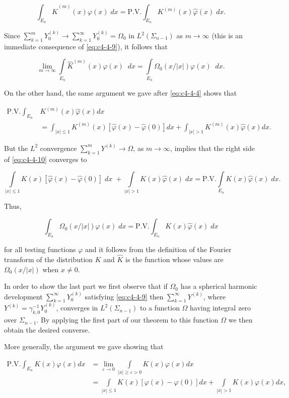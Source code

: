 \[
\int_{E_{n}}\hat{K}^{(m)}(x)\varphi(x)\;d x=\mathrm{P.V.}\int_{E_{n}}K^{(m)}(x)\hat{\varphi}(x)\;d x.
\]

Since $\sum_{k=1}^{m} Y_0^{(k)} \to \sum_{k=1}^{\infty} Y_0^{(k)} = \Omega_0$ in $L^2(\Sigma_{n-1})$ as $m \to \infty$ (this is an immediate consequence of \eqref{eq:c4-4-9}), it follows that

\[
\lim_{m\to\infty}\int\limits_{E_{n}}\hat{K}^{(m)}(x)\varphi(x)\mathop{}{d}x=\int\limits_{E_{n}}\Omega_{0}(x/|x|)\varphi(x)\mathop{}{d}x.
\]

On the other hand, the same argument we gave after \eqref{eq:c4-4-4} shows that

\begin{equation}\label{eq:c4-4-10}
\begin{aligned}\mathrm{P.V.}\int_{E_{n}}&K^{(m)}(x)\hat{\varphi}(x)dx\\&=\int_{|x|\leq1}K^{(m)}(x)[\hat{\varphi}(x)-\hat{\varphi}(0)]dx+\int_{|x|>1}K^{(m)}(x)\hat{\varphi}(x)dx.\end{aligned}
\end{equation}

But the $L^2$ convergence $\sum_{k=1}^m Y^{(k)} \to \Omega$, as $m \to \infty$, implies that the right side of \eqref{eq:c4-4-10} converges to

\[
\int\limits_{|x|\leq1}K(x)[\hat{\varphi}(x)-\hat{\varphi}(0)]\;{d}x\;+\int\limits_{|x|>1}K(x)\hat{\varphi}(x)\;{d}x=\mathrm{P.V.}\int\limits_{E_{n}}K(x)\hat{\varphi}(x)\;{d}x.
\]

Thus,

\[
\int_{E_{n}}\Omega_{0}(x/|x|)\varphi(x)\;d x=\mathrm{P.V.}\int_{E_{n}}K(x)\hat{\varphi}(x)\;d x
\]

for all testing functions $\varphi$ and it follows from the definition of the Fourier transform of the distribution $K$ and $\hat{K}$ is the function whose values are $\Omega_0(x/|x|)$ when $x \neq 0$.

In order to show the last part we first observe that if $\Omega_0$ has a spherical harmonic development $\sum_{k=1}^{\infty} Y_0^{(k)}$ satisfying \eqref{eq:c4-4-9} then $\sum_{k=1}^{\infty} Y^{(k)}$, where $Y^{(k)} = \gamma_{k,0}^{-1} Y_0^{(k)}$, converges in $L^2(\Sigma_{n-1})$ to a function $\Omega$ having integral zero over $\Sigma_{n-1}$. By applying the first part of our theorem to this function $\Omega$ we then obtain the desired converse.

More generally, the argument we gave showing that

\[
\begin{aligned}\mathrm{P.V.}\int_{E_{n}}K(x)\varphi(x)dx&=\lim_{\varepsilon\to0}\int\limits_{|x|\geq\varepsilon>0}K(x)\varphi(x)dx\\&=\int\limits_{|x|\leq1}K(x)[\varphi(x)-\varphi(0)]dx+\int\limits_{|x|>1}K(x)\varphi(x)dx,\end{aligned}
\]

